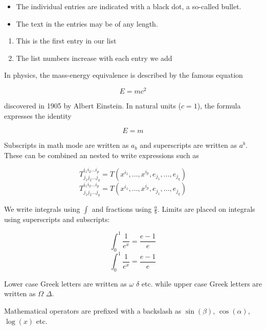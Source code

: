 \documentclass[12pt, letterpaper, twoside]{article}
\begin{document}
\begin{itemize}
  \item The individual entries are indicated with a black dot, a so-called bullet.
  \item The text in the entries may be of any length.
\end{itemize}

\begin{enumerate}
  \item This is the first entry in our list
  \item The list numbers increase with each entry we add
\end{enumerate}

In physics, the mass-energy equivalence is described by the famous equation
 
\[ E=mc^2 \]
 
discovered in 1905 by Albert Einstein. 
In natural units ($c = 1$), the formula expresses the identity
 
\begin{equation}
E=m
\end{equation}

Subscripts in math mode are written as $a_b$ and superscripts are written as $a^b$.
These can be combined an nested to write expressions such as
 
\[ T^{i_1 i_2 \dots i_p}_{j_1 j_2 \dots j_q} = T(x^{i_1},\dots,x^{i_p},e_{j_1},\dots,e_{j_q}) \]
\[ T_{j_1 j_2 \dots j_q}^{i_1 i_2 \dots i_p} = T(x^{i_1},\dots,x^{i_p},e_{j_1},\dots,e_{j_q}) \]
 
We write integrals using $\int$ and fractions using $\frac{a}{b}$.
Limits are placed on integrals using superscripts and subscripts:
 
\[ \int_0^1 \frac{1}{e^x} =  \frac{e-1}{e} \]
\[ \int^1_0 \frac{1}{e^x} =  \frac{e-1}{e} \]
 
Lower case Greek letters are written as $\omega$ $\delta$ etc. while upper case Greek
letters are written as $\Omega$ $\Delta$.
 
Mathematical operators are prefixed with a backslash as $\sin(\beta)$, $\cos(\alpha)$, $\log(x)$ etc.
\end{document}
